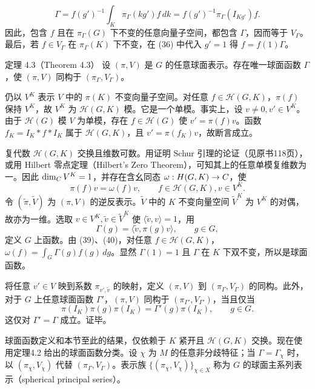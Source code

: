 \[
\Gamma=f(g')^{-1}\int_K\pi_\Gamma(kg')f\,dk
=f(g')^{-1}\pi_\Gamma(I_{Kg'})f.\tag{38}
\]
因此，包含 $f$ 且在 $\pi_\Gamma(G)$ 下不变的任意向量子空间，都包含 $\Gamma$，因而等于 $V_\Gamma$。最后，若 $f\in V_\Gamma$ 在 $\pi_\Gamma(K)$ 下不变，在 (36) 中代入 $g'=1$ 得 $f=f(1)\Gamma$。
\begin{originaltheorem}{定理 4.3（Theorem 4.3）}
设 $(\pi,V)$ 是 $G$ 的任意球面表示。存在唯一球面函数 $\Gamma$，使 $(\pi,V)$ 同构于 $(\pi_\Gamma,V_\Gamma)$。
\end{originaltheorem}
仍以 $V^K$ 表示 $V$ 中的 $\pi(K)$ 不变向量子空间。对任意 $f\in\mathcal H(G,K)$，$\pi(f)$ 保持 $V^K$，故 $V^K$ 为 $\mathcal H(G,K)$ 模。它是一个单模。事实上，设 $v\ne0,v'\in V^K$。由于 $\mathcal H(G)$ 模 $V$ 为单模，存在 $f\in\mathcal H(G)$ 使 $v'=\pi(f)v$。函数 $f_K=I_K*f*I_K$ 属于 $\mathcal H(G,K)$，且 $v'=\pi(f_K)v$，故断言成立。

复代数 $\mathcal H(G,K)$ 交换且维数可数。用证明 Schur 引理的论证（见原书118页），或用 Hilbert 零点定理（Hilbert's Zero Theorem），可知其上的任意单模复维数为一。因此 $\dim_C V^K=1$，并存在含幺同态 $\omega:H(G,K)\to C$，使
\[
\pi(f)v=\omega(f)v,\qquad f\in\mathcal H(G,K),v\in V^K.\tag{39}
\]
令 $(\widetilde\pi,\widetilde V)$ 为 $(\pi,V)$ 的逆反表示。$\widetilde V$ 中的 $K$ 不变向量空间 $\widetilde V^K$ 为 $V^K$ 的对偶，故亦为一维。选取 $v\in V^K,\widetilde v\in\widetilde V^K$ 使 $\langle\widetilde v,v\rangle=1$，用
\[
\Gamma(g)=\langle\widetilde v,\pi(g)v\rangle,\qquad g\in G,\tag{40}
\]
定义 $G$ 上函数。由 (39)、(40)，对任意 $f\in\mathcal H(G,K)$，$\omega(f)=\int_G\Gamma(g)f(g)\,dg$。显然 $\Gamma(1)=1$ 且 $\Gamma$ 在 $K$ 下双不变，所以是球面函数。

将任意 $v'\in V$ 映到系数 $\pi_{v',\widetilde v}$ 的映射，定义 $(\pi,V)$ 到 $(\pi_\Gamma,V_\Gamma)$ 的同构。此外，对于 $G$ 上任意球面函数 $\Gamma'$，$(\pi,V)$ 同构于 $(\pi_{\Gamma'},V_{\Gamma'})$，当且仅当
\[
\pi(I_K)\pi(g)\pi(I_K)=\Gamma'(g)\pi(I_K),\qquad g\in G.\tag{41}
\]
这仅对 $\Gamma'=\Gamma$ 成立。证毕。

球面函数定义和本节至此的结果，仅依赖于 $K$ 紧开且 $\mathcal H(G,K)$ 交换。现在使用定理4.2 给出的球面函数分类。设 $\chi$ 为 $M$ 的任意非分歧特征；当 $\Gamma=\Gamma_\chi$ 时，以 $(\pi_\chi,V_\chi)$ 代替 $(\pi_\Gamma,V_\Gamma)$。表示族 $\{(\pi_\chi,V_\chi)\}_{\chi\in X}$ 称为 $G$ 的球面主系列表示（spherical principal series）。

